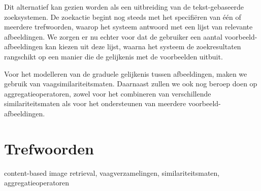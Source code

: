Dit alternatief kan gezien worden als een uitbreiding van de tekst-gebaseerde zoeksystemen.
De zoekactie begint nog steeds met het specifi\"eren van \'e\'en of meerdere trefwoorden, waarop
het systeem antwoord met een lijst van relevante afbeeldingen. We zorgen er nu echter voor
dat de gebruiker een aantal voorbeeld-afbeeldingen kan kiezen uit deze lijst, waarna het
systeem de zoekresultaten rangschikt op een manier die de gelijkenis met de voorbeelden uitbuit.

Voor het modelleren van de graduele gelijkenis tussen afbeeldingen, maken we gebruik van 
vaagsimilariteitsmaten. Daarnaast zullen we ook nog beroep doen op aggregatieoperatoren,
zowel voor het combineren van verschillende similariteitsmaten als voor het ondersteunen van
meerdere voorbeeld-afbeeldingen. 

\section*{Trefwoorden}
content-based image retrieval, vaagverzamelingen, similariteitsmaten, aggregatieoperatoren

